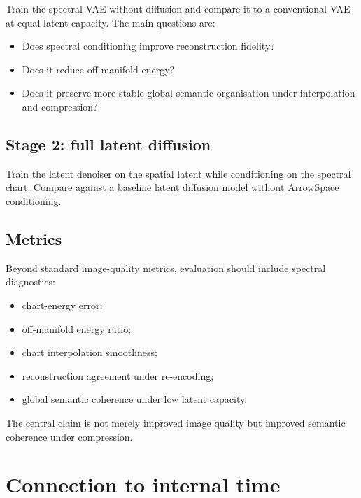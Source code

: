 \documentclass[11pt]{article}
\begin{document}
Train the spectral VAE without diffusion and compare it to a conventional VAE
at equal latent capacity. The main questions are:

\begin{itemize}[leftmargin=1.5em]
\item Does spectral conditioning improve reconstruction fidelity?
\item Does it reduce off-manifold energy?
\item Does it preserve more stable global semantic organisation under
interpolation and compression?
\end{itemize}

\subsection{Stage 2: full latent diffusion}
\label{sec:stage2}

Train the latent denoiser on the spatial latent while conditioning on the
spectral chart. Compare against a baseline latent diffusion model without
ArrowSpace conditioning.

\subsection{Metrics}
\label{sec:metrics}

Beyond standard image-quality metrics, evaluation should include spectral
diagnostics:

\begin{itemize}[leftmargin=1.5em]
\item chart-energy error;
\item off-manifold energy ratio;
\item chart interpolation smoothness;
\item reconstruction agreement under re-encoding;
\item global semantic coherence under low latent capacity.
\end{itemize}

The central claim is not merely improved image quality but improved
semantic coherence under compression.

\section{Connection to internal time}
\label{sec:internal_time_connection}
\end{document}
